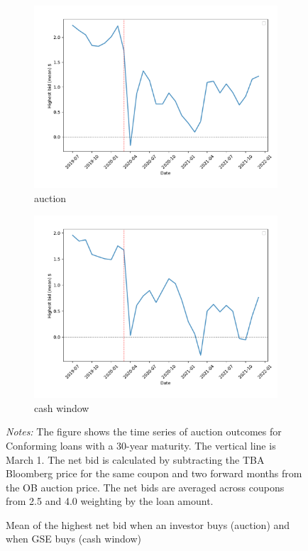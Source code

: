 \documentclass[11pt,a4paper]{article}
\begin{document}
\begin{figure}[h]
  \centering
     \begin{subfigure}[b]{0.49\textwidth} 
      \includegraphics[width=0.998\textwidth]{../results/figures/w_winner_bid_mean_n_mat30_loan1_timeseries_nrmonthly_2.5_4_auction_netbid.pdf}
      \caption{ auction}
     \end{subfigure}
     \begin{subfigure}[b]{0.49\textwidth}
      \includegraphics[width=0.998\textwidth]{../results/figures/w_winner_bid_mean_n_mat30_loan1_timeseries_nrmonthly_2.5_4_cash_window_netbid.pdf}
      \caption{cash window}
     \end{subfigure}
   \caption{Mean of the highest net bid when an investor buys (auction) and when GSE buys (cash window)} 
   \begin{minipage}{\textwidth}
      \footnotesize{\textit{Notes:} The figure shows the time series of auction outcomes for Conforming loans with a 30-year maturity.  The vertical line is March 1. The net bid is calculated by subtracting the TBA Bloomberg price for the same coupon and two forward months from the OB auction price. 
      The net bids are averaged across coupons from 2.5 and 4.0 weighting by the loan amount. }
      \end{minipage}
\end{figure}
\end{document}
